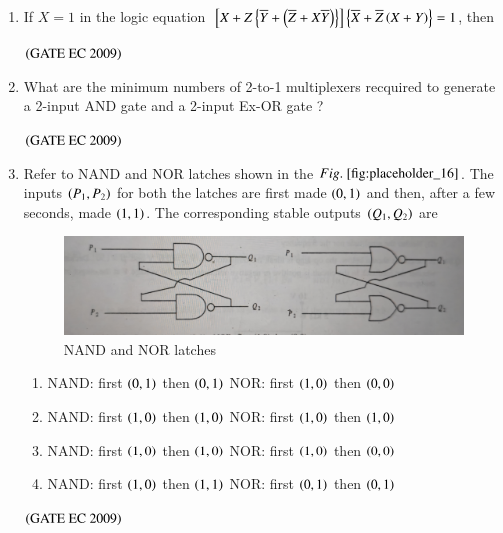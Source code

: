 \documentclass[journal,12pt,onecolumn]{IEEEtran}
\theoremstyle{remark}
\begin{document}
\begin{enumerate}[start=1, label={Q\arabic*.}]
\item If $X=1$ in the logic equation ${}\left[X + Z\left\{\overline{Y} + \left(\overline{Z} + X\overline{Y}\right)\right\}\right] \left\{\overline{X} + \overline{Z}\left(X+Y\right)\right\} = 1$, then
\begin{enumerate}
\end{enumerate}
\hfill $\left(\text{GATE EC 2009}\right)$

\item What are the minimum numbers of 2-to-1 multiplexers recquired to generate a 2-input AND gate and a 2-input Ex-OR gate ?
\begin{enumerate}
\end{enumerate}
\hfill $\left(\text{GATE EC 2009}\right)$

\item Refer to NAND and NOR latches shown in the $\figref{fig:placeholder_16}$. The inputs $\left(P_1,P_2\right)$ for both the latches are first made $\left(0,1\right)$ and then, after a few seconds, made $\left(1,1\right)$. The corresponding stable outputs $\left(Q_1, Q_2\right)$ are
\begin{figure}[H]
    \centering
    \includegraphics[width=0.5\columnwidth]{figs/img_16.jpg}
    \caption{NAND and NOR latches}
    \label{fig:placeholder_16}
\end{figure}
\begin{enumerate}
    \item NAND: first $\left(0,1\right)$ then $\left(0,1\right)$   NOR: first $\left(1,0\right)$ then $\left(0,0\right)$
    \item NAND: first $\left(1,0\right)$ then $\left(1,0\right)$   NOR: first $\left(1,0\right)$ then $\left(1,0\right)$
    \item NAND: first $\left(1,0\right)$ then $\left(1,0\right)$   NOR: first $\left(1,0\right)$ then $\left(0,0\right)$
    \item NAND: first $\left(1,0\right)$ then $\left(1,1\right)$   NOR: first $\left(0,1\right)$ then $\left(0,1\right)$
\end{enumerate}
\hfill $\left(\text{GATE EC 2009}\right)$


\end{enumerate}
\end{document}
